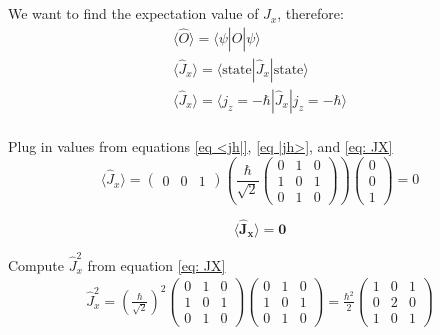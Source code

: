 \documentclass[12pt]{article}
\begin{document}
        We want to find the expectation value of $\hat{J}_x$, therefore:
        \begin{align*}
            \langle \hat{O} \rangle = \langle \psi | \hat{O} | \psi \rangle \\
            \langle \hat{J}_x \rangle = \langle \text{state} | \hat{J}_x | \text{state} \rangle \\
            \langle \hat{J}_x \rangle = \langle j_z = - \hbar | \hat{J}_x | j_z = -\hbar \rangle \\
        \end{align*}

        Plug in values from equations \ref{eq <jh|}, \ref{eq |jh>}, and \ref{eq: JX}
        \[
            \langle \hat{J}_x \rangle = \begin{pmatrix}
                0 & 0 & 1
            \end{pmatrix} \left( \frac{\hbar}{\sqrt{2}} \begin{pmatrix}
                0 & 1 & 0 \\
                1 & 0 & 1 \\
                0 & 1 & 0
            \end{pmatrix} \right) \begin{pmatrix}
                0 \\ 0 \\ 1
            \end{pmatrix} = 0
        \]

        \[
            \boldsymbol{\boxed{\langle \hat{J}_x \rangle = 0}}
        \]

        Compute $\hat{J}_x^2$ from equation \ref{eq: JX}
        \begin{equation} \label{eq: JX2}
            \begin{split}
                \hat{J}_x^2 = \left( \frac{\hbar}{\sqrt{2}} \right)^2 \begin{pmatrix}
                    0 & 1 & 0 \\
                    1 & 0 & 1 \\
                    0 & 1 & 0 
                \end{pmatrix} \begin{pmatrix}
                    0 & 1 & 0 \\
                    1 & 0 & 1 \\
                    0 & 1 & 0
                \end{pmatrix} = \frac{\hbar^2}{2} \begin{pmatrix}
                    1 & 0 & 1 \\
                    0 & 2 & 0 \\
                    1 & 0 & 1
                \end{pmatrix}
                \end{split}
        \end{equation}
\end{document}
